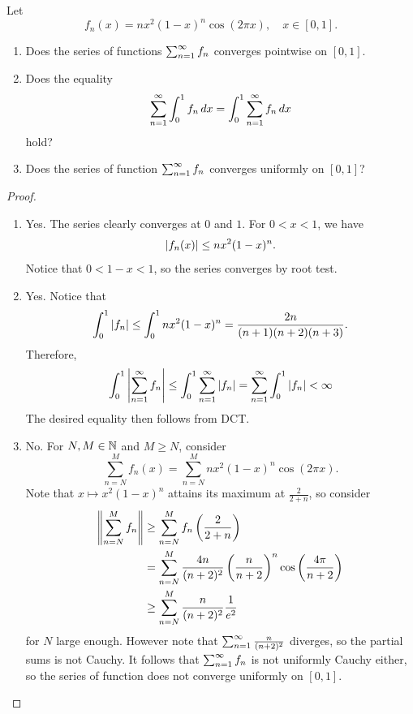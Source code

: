 \documentclass[a4paper]{article}
\begin{document}
\begin{ex}[Midterm 1]
  Let
  \[
    f_n(x) = n x^2 (1 - x)^n \cos (2 \pi x), \quad x \in [0, 1].
  \]
  \begin{enumerate}
    \item Does the series of functions $\sum_{n=1}^\infty f_n$ converges pointwise
          on $[0, 1]$.
    \item Does the equality
          \[
            \sum_{n=1}^\infty \int_0^1 f_n \, d x = \int_0^1 \sum_{n=1}^\infty f_n \, d x
          \]
          hold?
    \item Does the series of function $\sum_{n=1}^\infty f_n$ converges uniformly
          on $[0, 1]$?
  \end{enumerate}
\end{ex}

\begin{proof}
  \begin{enumerate}
    \item Yes. The series clearly converges at $0$ and $1$. For $0 < x <
          1$, we have
          \[
            \left\lvert f_n(x)\right\rvert  \leq n x^2 (1 - x)^n.
          \]
          Notice that $0 < 1 - x < 1$, so the series converges by root
          test.
    \item Yes. Notice that
          \[
            \int_0^1 \left\lvert f_n\right\rvert \leq \int_0^1 n x^2 (1 - x)^n
            = \frac{2n}{(n + 1)(n + 2)(n + 3)}.
          \]
          Therefore,
          \[
            \int_0^1 \left\lvert \sum_{n=1}^\infty f_n\right\rvert \leq \int_0^1 \sum_{n=1}^\infty \left\lvert f_n\right\rvert
            = \sum_{n=1}^\infty \int_0^1 \left\lvert f_n\right\rvert < \infty
          \]
          The desired equality then follows from DCT.
    \item No. For $N, M \in \mathbb{N}$ and $M \geq N$, consider
          \[
            \sum_{n = N}^M f_n(x)
            = \sum_{n = N}^M n x^2 (1 - x)^n \cos (2 \pi x).
          \]
          Note that $x \mapsto x^2 (1 - x)^n$ attains its maximum at
          $\frac{2}{2 + n}$, so consider
          \begin{align*}
            \left\lVert \sum_{n = N}^M f_n\right\rVert
             & \geq \sum_{n = N}^M f_n \left( \frac{2}{2 + n} \right)                 \\
             & = \sum_{n = N}^M \frac{4n}{(n + 2)^2} \left( \frac{n}{n + 2} \right)^n
            \cos \left( \frac{4 \pi}{n + 2} \right)                                   \\
             & \geq \sum_{n = N}^M \frac{n}{(n + 2)^2} \frac{1}{e^2}
          \end{align*}
          for $N$ large enough. However note that $\sum_{n=1}^\infty \frac{n}{(n +
              2)^2}$ diverges, so the partial sums is not Cauchy. It follows
          that $\sum_{n=1}^\infty f_n$ is not uniformly Cauchy either, so the
          series of function does not converge uniformly on $[0, 1]$.
  \end{enumerate}
\end{proof}
\end{document}
